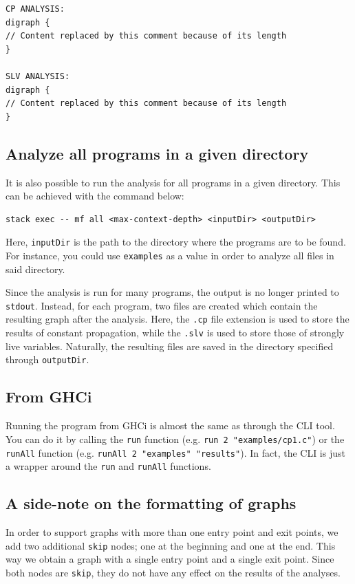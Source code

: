 \documentclass{article}
\begin{document}
\begin{verbatim}
CP ANALYSIS:
digraph {
// Content replaced by this comment because of its length
}

SLV ANALYSIS:
digraph {
// Content replaced by this comment because of its length
}
\end{verbatim}

\subsection*{Analyze all programs in a given directory}

It is also possible to run the analysis for all programs in a given directory. This can be achieved with the command below:

\begin{verbatim}
stack exec -- mf all <max-context-depth> <inputDir> <outputDir>
\end{verbatim}

Here, \texttt{inputDir} is the path to the directory where the programs are to be found. For instance, you could use \texttt{examples} as a value in order to analyze all files in said directory.

Since the analysis is run for many programs, the output is no longer printed to \texttt{stdout}. Instead, for each program, two files are created which contain the resulting graph after the analysis. Here, the \texttt{.cp} file extension is used to store the results of constant propagation, while the \texttt{.slv} is used to store those of strongly live variables. Naturally, the resulting files are saved in the directory specified through \texttt{outputDir}.

\subsection*{From GHCi}

Running the program from GHCi is almost the same as through the CLI tool. You can do it by calling the \texttt{run} function (e.g. \texttt{run 2 "examples/cp1.c"}) or the \texttt{runAll} function (e.g. \texttt{runAll 2 "examples" "results"}). In fact, the CLI is just a wrapper around the \texttt{run} and \texttt{runAll} functions.

\subsection*{A side-note on the formatting of graphs}

In order to support graphs with more than one entry point and exit points, we add two additional \texttt{skip} nodes; one at the beginning and one at the end. This way we obtain a graph with a single entry point and a single exit point. Since both nodes are \texttt{skip}, they do not have any effect on the results of the analyses.
\end{document}
